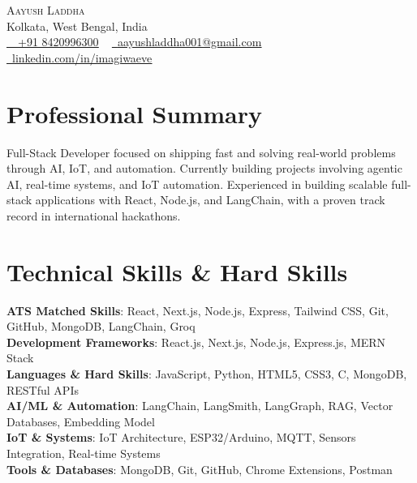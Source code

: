 \documentclass[letterpaper,11pt]{article}
\begin{document}
\begin{center}
    {\Huge \scshape Aayush Laddha} \\ \vspace{1pt}
    Kolkata, West Bengal, India \\ \vspace{1pt}
    \small \href{tel:+918420996300}{\raisebox{-0.1\height}\faPhone\ \ \underline{+91 8420996300}} ~ \href{mailto:aayushladdha001@gmail.com}{\raisebox{-0.2\height}\faEnvelope\  \underline{aayushladdha001@gmail.com}} ~ 
    \href{https://www.linkedin.com/in/imagiwaeve}{\raisebox{-0.2\height}\faLinkedin\ \underline{linkedin.com/in/imagiwaeve}}
    \vspace{-8pt}
\end{center}

\section{Professional Summary}
\small{Full-Stack Developer focused on shipping fast and solving real-world problems through AI, IoT, and automation. Currently building projects involving agentic AI, real-time systems, and IoT automation. Experienced in building scalable full-stack applications with React, Node.js, and LangChain, with a proven track record in international hackathons.}
\vspace{-10pt}

\section{Technical Skills \& Hard Skills}
 \begin{itemize}[leftmargin=0.15in, label={}]
    \small{\item{
     \textbf{ATS Matched Skills}{: React, Next.js, Node.js, Express, Tailwind CSS, Git, GitHub, MongoDB, LangChain, Groq} \\
     \textbf{Development Frameworks}{: React.js, Next.js, Node.js, Express.js, MERN Stack} \\
     \textbf{Languages \& Hard Skills}{: JavaScript, Python, HTML5, CSS3, C, MongoDB, RESTful APIs} \\
     \textbf{AI/ML \& Automation}{: LangChain, LangSmith, LangGraph, RAG, Vector Databases, Embedding Model} \\
     \textbf{IoT \& Systems}{: IoT Architecture, ESP32/Arduino, MQTT, Sensors Integration, Real-time Systems} \\
     \textbf{Tools \& Databases}{: MongoDB, Git, GitHub, Chrome Extensions, Postman}
    }}
 \end{itemize}
 \vspace{-16pt}
\end{document}
